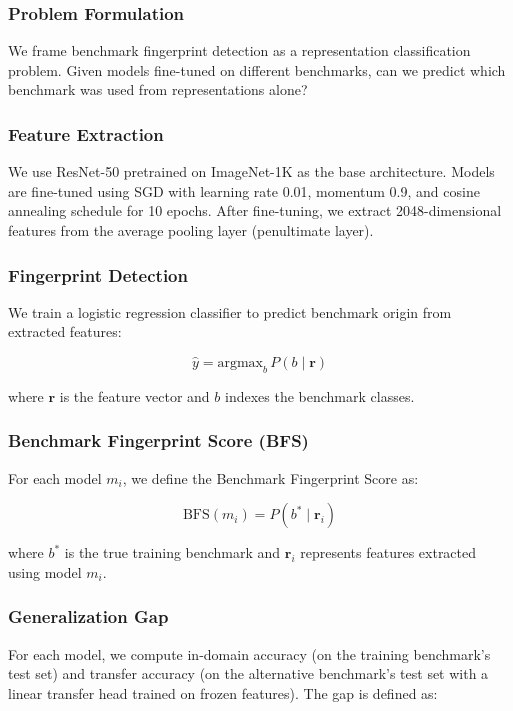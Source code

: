 
\subsubsection{Problem Formulation}

We frame benchmark fingerprint detection as a representation classification problem. Given models fine-tuned on different benchmarks, can we predict which benchmark was used from representations alone?

\subsubsection{Feature Extraction}

We use ResNet-50 \citep{he2016deep} pretrained on ImageNet-1K as the base architecture. Models are fine-tuned using SGD with learning rate 0.01, momentum 0.9, and cosine annealing schedule for 10 epochs. After fine-tuning, we extract 2048-dimensional features from the average pooling layer (penultimate layer).

\subsubsection{Fingerprint Detection}

We train a logistic regression classifier to predict benchmark origin from extracted features:

$$\hat{y} = \text{argmax}_b \, P(b \mid \mathbf{r})$$

where $\mathbf{r}$ is the feature vector and $b$ indexes the benchmark classes.

\subsubsection{Benchmark Fingerprint Score (BFS)}

For each model $m_i$, we define the Benchmark Fingerprint Score as:

$$\text{BFS}(m_i) = P(b^* \mid \mathbf{r}_i)$$

where $b^*$ is the true training benchmark and $\mathbf{r}_i$ represents features extracted using model $m_i$.

\subsubsection{Generalization Gap}

For each model, we compute in-domain accuracy (on the training benchmark's test set) and transfer accuracy (on the alternative benchmark's test set with a linear transfer head trained on frozen features). The gap is defined as:

